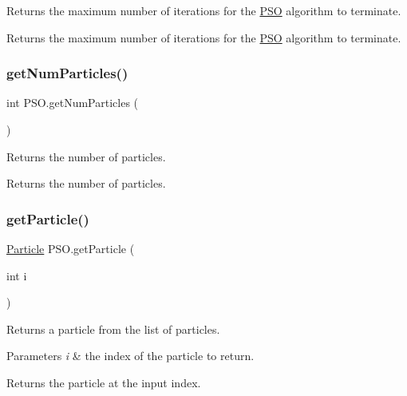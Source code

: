Returns the maximum number of iterations for the \hyperlink{class_p_s_o}{P\+SO} algorithm to terminate. \begin{DoxyReturn}{Returns}
the maximum number of iterations for the \hyperlink{class_p_s_o}{P\+SO} algorithm to terminate. 
\end{DoxyReturn}
\mbox{\label{class_p_s_o_acc2a16aac995a30f3265fa06182509af}} 
\subsubsection{\texorpdfstring{get\+Num\+Particles()}{getNumParticles()}}
{\footnotesize\ttfamily int P\+S\+O.\+get\+Num\+Particles (\begin{DoxyParamCaption}{ }\end{DoxyParamCaption})}

Returns the number of particles. \begin{DoxyReturn}{Returns}
the number of particles. 
\end{DoxyReturn}
\mbox{\label{class_p_s_o_a3c697a11238d768ae2b1236d3cf6ea88}} 
\subsubsection{\texorpdfstring{get\+Particle()}{getParticle()}}
{\footnotesize\ttfamily \hyperlink{class_particle}{Particle} P\+S\+O.\+get\+Particle (\begin{DoxyParamCaption}\item[{int}]{i }\end{DoxyParamCaption})}

Returns a particle from the list of particles. 
\begin{DoxyParams}{Parameters}
{\em i} & the index of the particle to return. \\
\hline
\end{DoxyParams}
\begin{DoxyReturn}{Returns}
the particle at the input index. 
\end{DoxyReturn}
\mbox{\label{class_p_s_o_a46ddfeb9df3a42b2f1b2c4fe0d8f51b2}} 
